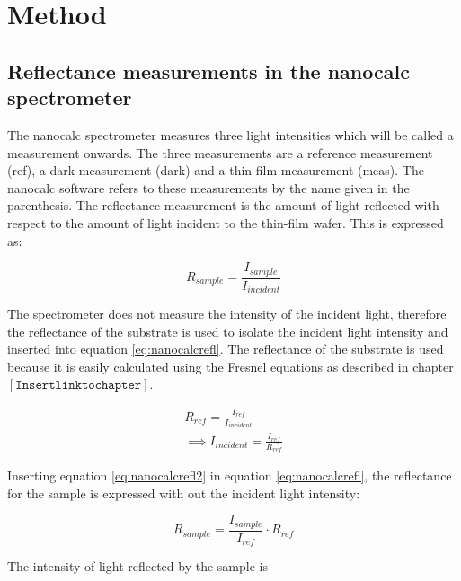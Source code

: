 \documentclass[MasterThesisMain.tex]{subfiles}
\begin{document}
	\chapter{Method}
	
	\section{Reflectance measurements in the nanocalc spectrometer}
The nanocalc spectrometer measures three light intensities which will be called a measurement onwards. The three measurements are a reference measurement (ref), a dark measurement (dark) and a thin-film measurement (meas). The nanocalc software refers to these measurements by the name given in the parenthesis. The reflectance measurement is the amount of light reflected with respect to the amount of light incident to the thin-film wafer. This is expressed as:

\begin{equation}\label{eq:nanocalcrefl}
R_{sample} = \frac{I_{sample}}{I_{incident}}
\end{equation}

The spectrometer does not measure the intensity of the incident light, therefore the reflectance of the substrate is used to isolate the incident light intensity and inserted into equation \ref{eq:nanocalcrefl}. The reflectance of the substrate is used because it is easily calculated using the Fresnel equations as described in chapter $[\mathtt{Insert link to chapter}]$.

\begin{align}\label{eq:nanocalcrefl2}
R_{ref} = \frac{I_{ref}}{I_{incident}}\\
\implies  I_{incident} = \frac{I_{ref}}{R_{ref}}
\end{align}

Inserting equation \ref{eq:nanocalcrefl2} in equation \ref{eq:nanocalcrefl}, the reflectance for the sample is expressed with out the incident light intensity:

\begin{equation}
R_{sample} = \frac{I_{sample}}{I_{ref}} \cdot R_{ref}
\end{equation}

The intensity of light reflected by the sample is 
\end{document}
